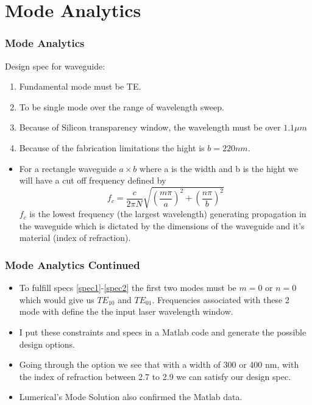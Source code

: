 \documentclass{beamer}
\begin{document}
\section{Mode Analytics} 
\begin{frame}
\frametitle{Mode Analytics}
Design spec for waveguide:
\begin{enumerate}
\item Fundamental mode must be TE.\label{spec1}
\item To be single mode over the range of wavelength sweep. \label{spec2}
\item Because of Silicon transparency window, the wavelength must be over $1.1 \mu m$
\item Because of the fabrication limitations the hight is $b=220 nm$.
\end{enumerate}
%
\begin{itemize}
\item  For a rectangle waveguide $a \times b$ where a is the width and b is the hight we will have a cut off frequency defined by
\begin{equation}
f_c =\frac{c}{2\pi N} \sqrt{(\frac{m\pi}{a})^2 +(\frac{n\pi}{b})^2}
\end{equation}
$f_c$ is the lowest frequency (the largest wavelength) generating propagation in the waveguide which is dictated by the dimensions of the waveguide and it's material (index of refraction). 
\end{itemize}
\end{frame}
%
\begin{frame}
\frametitle{Mode Analytics Continued}
\begin{itemize}
\item To fulfill specs \ref{spec1}-\ref{spec2} the first two modes must be $m=0$ or $n=0$ which would give us $TE_{10}$ and $TE_{01}$. Frequencies associated with these 2 mode with define the the input laser wavelength window.
\item I put these constraints and specs  in a Matlab code and generate the possible design options. 
\item Going through the option we see that with a width of 300 or 400 nm, with the index of refraction between 2.7 to 2.9 we can satisfy our design spec.
\item Lumerical's Mode Solution also confirmed the Matlab data.
\end{itemize}
\end{frame}
%
\end{document}
